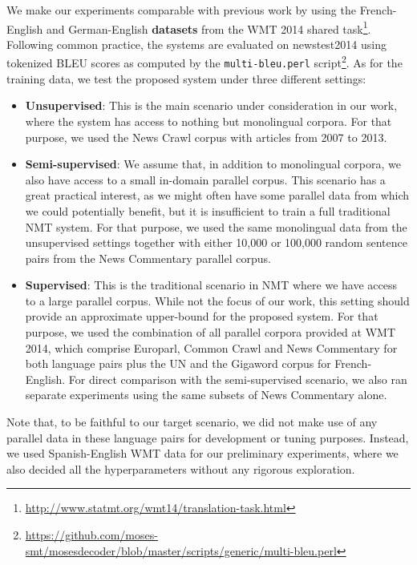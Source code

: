 \documentclass{article} \usepackage{iclr2018_conference,times}
\begin{document}
We make our experiments comparable with previous work by using the French-English and German-English \textbf{datasets} from the WMT 2014 shared task\footnote{\url{http://www.statmt.org/wmt14/translation-task.html}}. Following common practice, the systems are evaluated on newstest2014 using tokenized BLEU scores as computed by the \texttt{multi-bleu.perl} script\footnote{\url{https://github.com/moses-smt/mosesdecoder/blob/master/scripts/generic/multi-bleu.perl}}. As for the training data, we test the proposed system under three different settings:
\begin{itemize}
\item \textbf{Unsupervised}: This is the main scenario under consideration in our work, where the system has access to nothing but monolingual corpora. For that purpose, we used the News Crawl corpus with articles from 2007 to 2013.
\item \textbf{Semi-supervised}: We assume that, in addition to monolingual corpora, we also have access to a small in-domain parallel corpus. This scenario has a great practical interest, as we might often have some parallel data from which we could potentially benefit, but it is insufficient to train a full traditional NMT system. For that purpose, we used the same monolingual data from the unsupervised settings together with either 10,000 or 100,000 random sentence pairs from the News Commentary parallel corpus.
\item \textbf{Supervised}: This is the traditional scenario in NMT where we have access to a large parallel corpus. While not the focus of our work, this setting should provide an approximate upper-bound for the proposed system. For that purpose, we used the combination of all parallel corpora provided at WMT 2014, which comprise Europarl, Common Crawl and News Commentary for both language pairs plus the UN and the Gigaword corpus for French-English. For direct comparison with the semi-supervised scenario, we also ran separate experiments using the same subsets of News Commentary alone.
\end{itemize}
Note that, to be faithful to our target scenario, we did not make use of any parallel data in these language pairs for development or tuning purposes. Instead, we used Spanish-English WMT data for our preliminary experiments, where we also decided all the hyperparameters without any rigorous exploration.
\end{document}
